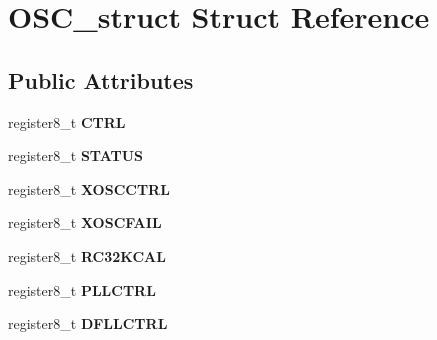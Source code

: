 \hypertarget{struct_o_s_c__struct}{}\section{O\+S\+C\+\_\+struct Struct Reference}
\label{struct_o_s_c__struct}
\subsection*{Public Attributes}
\begin{DoxyCompactItemize}
\item 
register8\+\_\+t {\bfseries C\+T\+RL}\hypertarget{struct_o_s_c__struct_abb55d14e49bb9b0d6e67d5a629f33469}{}\label{struct_o_s_c__struct_abb55d14e49bb9b0d6e67d5a629f33469}

\item 
register8\+\_\+t {\bfseries S\+T\+A\+T\+US}\hypertarget{struct_o_s_c__struct_a58fa3d26755565f35125d6b8c190b1c4}{}\label{struct_o_s_c__struct_a58fa3d26755565f35125d6b8c190b1c4}

\item 
register8\+\_\+t {\bfseries X\+O\+S\+C\+C\+T\+RL}\hypertarget{struct_o_s_c__struct_a380ee378fe8623ecd473c6656959cdaa}{}\label{struct_o_s_c__struct_a380ee378fe8623ecd473c6656959cdaa}

\item 
register8\+\_\+t {\bfseries X\+O\+S\+C\+F\+A\+IL}\hypertarget{struct_o_s_c__struct_aff9bd255b74da429124802d9dc4b0b52}{}\label{struct_o_s_c__struct_aff9bd255b74da429124802d9dc4b0b52}

\item 
register8\+\_\+t {\bfseries R\+C32\+K\+C\+AL}\hypertarget{struct_o_s_c__struct_a82e04fbafe8bb39238c2f90323bcdae4}{}\label{struct_o_s_c__struct_a82e04fbafe8bb39238c2f90323bcdae4}

\item 
register8\+\_\+t {\bfseries P\+L\+L\+C\+T\+RL}\hypertarget{struct_o_s_c__struct_ae66937d447af0de1d98a82b521c2dd80}{}\label{struct_o_s_c__struct_ae66937d447af0de1d98a82b521c2dd80}

\item 
register8\+\_\+t {\bfseries D\+F\+L\+L\+C\+T\+RL}\hypertarget{struct_o_s_c__struct_aacaa3061d2c95ae3a4492a48c8d337cf}{}\label{struct_o_s_c__struct_aacaa3061d2c95ae3a4492a48c8d337cf}

\end{DoxyCompactItemize}


